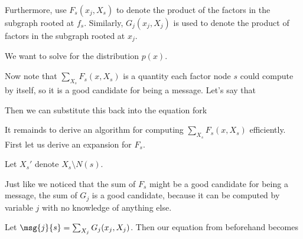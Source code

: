 \documentclass[12pt]{article}
\begin{document}
Furthermore, use $F_s(x_j, X_s)$ to denote the product of the factors in the subgraph rooted at $f_s$. Similarly, $G_j(x_j, X_j)$ is used to denote the product of factors in the subgraph rooted at $x_j$. 

We want to solve for the distribution $p(x)$.


Now note that $\sum_{X_s} F_s(x, X_s)$ is a quantity each factor node $s$ could compute by itself, so it is a good candidate for being a message. Let's say that


Then we can substitute this back into the equation fork

It remainds to derive an algorithm for computing $\sum_{X_s} F_s(x, X_s)$ efficiently. First let us derive an expansion for $F_s$.


Let $X_s'$ denote $X_s \setminus N(s)$. 


Just like we noticed that the sum of $F_s$ might be a good candidate for being a message, the sum of $G_j$ is a good candidate, because it can be computed by variable $j$ with no knowledge of anything else.

Let $\msg{j}{s} = \sum_{X_j} G_j(x_j, X_j)$. Then our equation from beforehand becomes

\end{document}
